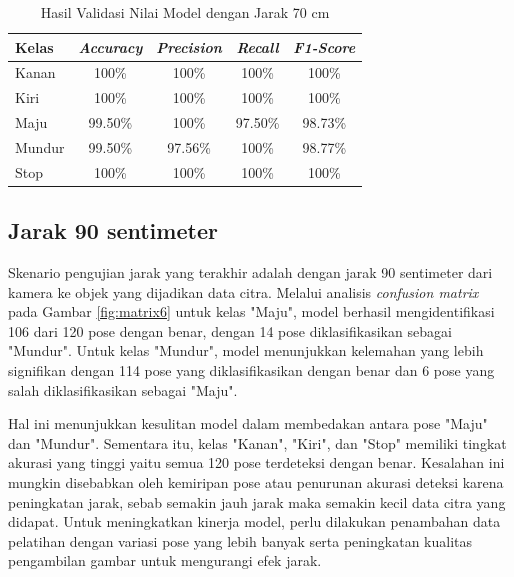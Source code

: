 \begin{longtable}{|l|c|c|c|c|}
  \caption{Hasil Validasi Nilai Model dengan Jarak 70 cm}
  \label{tb:vs_model5} \\
  \hline
  \rowcolor[HTML]{C0C0C0} 
  \textbf{Kelas} & \textbf{\emph{Accuracy}} & \textbf{\emph{Precision}} & \textbf{\emph{Recall}} & \textbf{\emph{F1-Score}} \\ \hline
  Kanan    & 100\%            & 100\%             & 100\%           & 100\%            \\ \hline
  Kiri     & 100\%          & 100\%           & 100\%           & 100\%           \\ \hline
  Maju      & 99.50\%          & 100\%           & 97.50\%          & 98.73\%          \\ \hline
  Mundur     & 99.50\%            & 97.56\%             & 100\%           & 98.77\%            \\ \hline
  Stop  & 100\%            & 100\%             & 100\%           & 100\%            \\ \hline
\end{longtable}

\subsection{Jarak 90 sentimeter}

Skenario pengujian jarak yang terakhir adalah dengan jarak 90 sentimeter dari kamera ke objek yang dijadikan data citra. Melalui analisis \emph{confusion matrix} pada Gambar \ref{fig:matrix6} untuk kelas "Maju", model berhasil mengidentifikasi 106 dari 120 pose dengan benar, dengan 14 pose diklasifikasikan sebagai "Mundur". Untuk kelas "Mundur", model menunjukkan kelemahan yang lebih signifikan dengan 114 pose yang diklasifikasikan dengan benar dan 6 pose yang salah diklasifikasikan sebagai "Maju". 

Hal ini menunjukkan kesulitan model dalam membedakan antara pose "Maju" dan "Mundur". Sementara itu, kelas "Kanan", "Kiri", dan "Stop" memiliki tingkat akurasi yang tinggi yaitu semua 120 pose terdeteksi dengan benar. Kesalahan ini mungkin disebabkan oleh kemiripan pose atau penurunan akurasi deteksi karena peningkatan jarak, sebab semakin jauh jarak maka semakin kecil data citra yang didapat. Untuk meningkatkan kinerja model, perlu dilakukan penambahan data pelatihan dengan variasi pose yang lebih banyak serta peningkatan kualitas pengambilan gambar untuk mengurangi efek jarak. 
  
